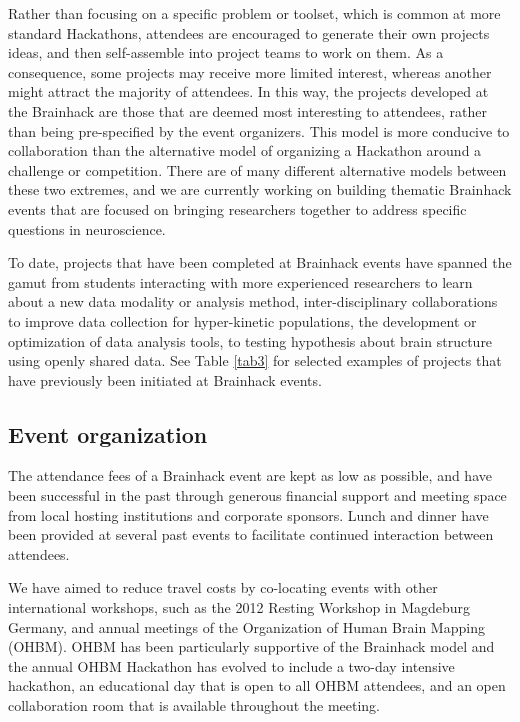 \documentclass[11pt]{bmc_article_s50}
\begin{document}
Rather than focusing on a specific problem or toolset, which is common at more standard Hackathons, attendees are encouraged to generate their own projects ideas, and then self-assemble into project teams to work on them. As a consequence, some projects may receive more limited interest, whereas another might attract the majority of attendees. In this way, the projects developed at the Brainhack are those that are deemed most interesting to attendees, rather than being pre-specified by the event organizers. This model is more conducive to collaboration than the alternative model of organizing a Hackathon around a challenge or competition. There are of many different alternative models between these two extremes, and we are currently working on building thematic Brainhack events that are focused on bringing researchers together to address specific questions in neuroscience.

To date, projects that have been completed at Brainhack events have spanned the gamut from students interacting with more experienced researchers to learn about a new data modality or analysis method, inter-disciplinary collaborations to improve data collection for hyper-kinetic populations, the development or optimization of data analysis tools, to testing hypothesis about brain structure using openly shared data. See Table \ref{tab3} for selected examples of projects that have previously been initiated at Brainhack events.

\subsection{Event organization}

The attendance fees of a Brainhack event are kept as low as possible, and have been successful in the past through generous financial support and meeting space from local hosting institutions and corporate sponsors. Lunch and dinner have been provided at several past events to facilitate continued interaction between attendees. 

We have aimed to reduce travel costs by co-locating events with other international workshops, such as the 2012 Resting Workshop in Magdeburg Germany, and annual meetings of the Organization of Human Brain Mapping (OHBM). OHBM has been particularly supportive of the Brainhack model and the annual OHBM Hackathon has evolved to include a two-day intensive hackathon, an educational day that is open to all OHBM attendees, and an open collaboration room that is available throughout the meeting.
\end{document}
